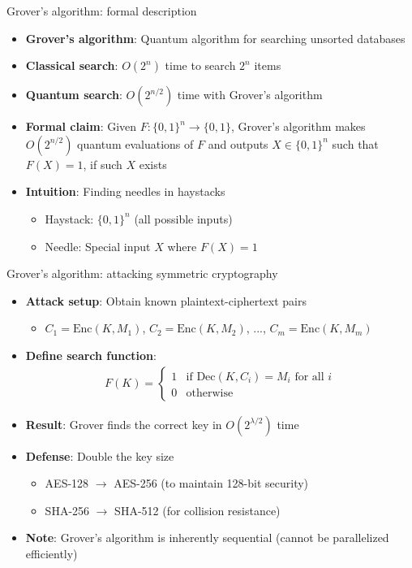 \documentclass[aspectratio=169, lualatex, handout]{beamer}
\begin{document}
\begin{frame}{Grover's algorithm: formal description}
	\begin{itemize}
		\item \textbf{Grover's algorithm}: Quantum algorithm for searching unsorted databases
		\item \textbf{Classical search}: $O(2^n)$ time to search $2^n$ items
		\item \textbf{Quantum search}: $O(2^{n/2})$ time with Grover's algorithm
		\item \textbf{Formal claim}: Given $F: \{0,1\}^n \rightarrow \{0,1\}$, Grover's algorithm makes $O(2^{n/2})$ quantum evaluations of $F$ and outputs $X \in \{0,1\}^n$ such that $F(X) = 1$, if such $X$ exists
		\item \textbf{Intuition}: Finding needles in haystacks
		      \begin{itemize}
			      \item Haystack: $\{0,1\}^n$ (all possible inputs)
			      \item Needle: Special input $X$ where $F(X) = 1$
		      \end{itemize}
	\end{itemize}
\end{frame}

\begin{frame}{Grover's algorithm: attacking symmetric cryptography}
	\begin{itemize}
		\item \textbf{Attack setup}: Obtain known plaintext-ciphertext pairs
		      \begin{itemize}
			      \item $C_1 = \text{Enc}(K, M_1)$, $C_2 = \text{Enc}(K, M_2)$, ..., $C_m = \text{Enc}(K, M_m)$
		      \end{itemize}
		\item \textbf{Define search function}:
		      \begin{align*}
			      F(K) = \begin{cases}
				             1 & \text{if } \text{Dec}(K, C_i) = M_i \text{ for all } i \\
				             0 & \text{otherwise}
			             \end{cases}
		      \end{align*}
		\item \textbf{Result}: Grover finds the correct key in $O(2^{\lambda/2})$ time
		\item \textbf{Defense}: Double the key size
		      \begin{itemize}
			      \item AES-128 $\rightarrow$ AES-256 (to maintain 128-bit security)
			      \item SHA-256 $\rightarrow$ SHA-512 (for collision resistance)
		      \end{itemize}
		\item \textbf{Note}: Grover's algorithm is inherently sequential (cannot be parallelized efficiently)
	\end{itemize}
\end{frame}
\end{document}
